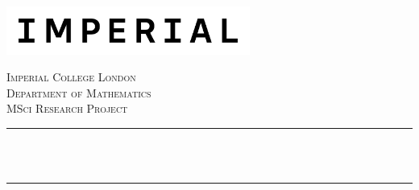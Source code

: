 \begin{titlepage}

\newcommand{\HRule}{\rule{\linewidth}{0.5mm}} %


\includegraphics[width=8cm]{title/logo.png}\\[1cm] %
 

\center %


\textsc{\LARGE Imperial College London}\\[0.5cm] %
\textsc{\Large Department of Mathematics}\\[1.5cm] %
\textsc{\Large MSci Research Project}\\[0.5cm] %

\makeatletter
\HRule \\[0.6cm]
{ \huge \bfseries \reporttitle}\\[0.6cm] %
\HRule \\[1.5cm]
 


\end{titlepage}
